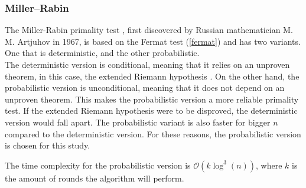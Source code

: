 \documentclass[main.tex]{subfiles}
\begin{document}


\subsubsection{Miller–Rabin} The Miller-Rabin primality test \cite{algh:miller},
first discovered by Russian mathematician M. M. Artjuhov in 1967, is based on
the Fermat test (\ref{fermat}) and has two variants. One that is deterministic, and the other probabilistic. \\

The deterministic version is conditional, meaning that it relies on an unproven
theorem, in this case, the extended Riemann hypothesis \cite{riemann}. On the
other hand, the probabilistic version is unconditional, meaning that it does not
depend on an unproven theorem. This makes the probabilistic version a more
reliable primality test. If the extended Riemann hypothesis were to be
disproved, the deterministic version would fall apart. The probabilistic variant
is also faster for bigger $n$ compared to the deterministic version. For these
reasons, the probabilistic version is chosen for this study. \newline

The time complexity for the probabilistic version is $\mathcal{O}(k
\log^{3}(n))$, where $k$ is the amount of rounds the algorithm will perform. \\


\end{document}
